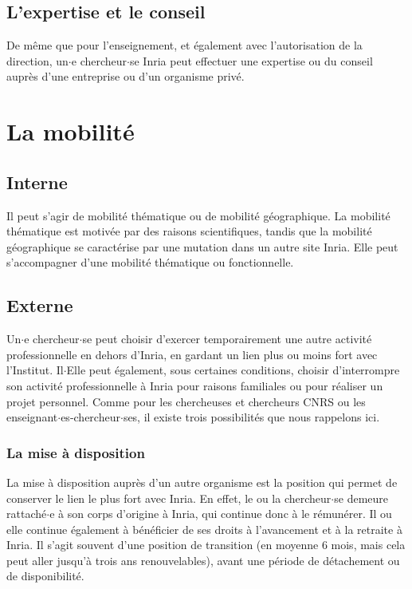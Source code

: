 \subsection{L'expertise et le conseil}
De m\^eme que pour l'enseignement, et \'egalement avec
l'autorisation de la direction, un$\cdot$e chercheur$\cdot$se Inria peut effectuer
une expertise ou du conseil aupr\`es d'une entreprise ou d'un
organisme priv\'e.

\section{La mobilit\'e}
\subsection{Interne}
Il peut s'agir de mobilit\'e th\'ematique ou de mobilit\'e
g\'eographique. La mobilit\'e th\'ematique est motiv\'ee par des
raisons scientifiques, tandis que la mobilit\'e g\'eographique se
caract\'erise par une mutation dans un autre site Inria. Elle peut
s'accompagner d'une mobilit\'e th\'ematique ou fonctionnelle.

\subsection{Externe}
\label{sec. mobex INRIA}
Un$\cdot$e chercheur$\cdot$se peut choisir d'exercer temporairement une autre
activit\'e professionnelle en dehors d'Inria, en gardant un lien
plus ou moins fort avec l'Institut. Il$\cdot$Elle peut \'egalement, sous
certaines conditions, choisir d'interrompre son activit\'e
professionnelle \`a Inria pour raisons familiales ou pour r\'ealiser
un projet personnel. Comme pour les chercheuses et chercheurs CNRS ou les
enseignant$\cdot$es-chercheur$\cdot$ses, il existe trois possibilit\'es que nous
rappelons ici.

\subsubsection{La mise \`a disposition}
La mise \`a disposition aupr\`es d'un autre organisme est la position
qui permet de conserver le lien le plus fort avec Inria. En effet,
le ou la chercheur$\cdot$se demeure rattach\'e$\cdot$e \`a son corps d'origine \`a Inria, qui
continue donc \`a le r\'emun\'erer. Il ou elle continue \'egalement \`a
b\'en\'eficier de ses droits \`a l'avancement et \`a la retraite \`a
Inria. Il s'agit souvent d'une position de transition (en moyenne 6
mois, mais cela peut aller jusqu'\`a trois ans renouvelables), avant
une p\'eriode de d\'etachement ou de disponibilit\'e.

